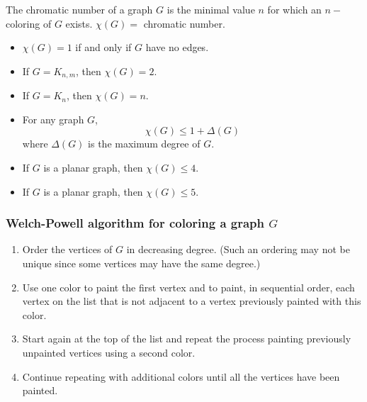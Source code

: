 \documentclass[aspectratio=169]{beamer}
\begin{document}
\begin{frame}
\begin{definition}
The chromatic number of a graph $G$ is the minimal value $n$ for which an $n-$coloring of $G$ exists.
$\chi (G)=$ chromatic number.
\end{definition}
\begin{theorem}
\begin{itemize}
\item $\chi (G)=1$ if and only if $G$ have no edges.
\item If $G=K_{n,m}$, then $\chi(G)=2$.
\item If $G=K_n$, then $\chi(G)=n$.
\item For any graph $G$, $$\chi (G)\leq 1+ \Delta (G)$$
where $\Delta (G)$ is the maximum degree of $G$.
\item If $G$ is a planar graph, then $\chi(G) \leq 4$.
\item If $G$ is a planar graph, then $\chi(G) \leq 5$.
\end{itemize}
\end{theorem}
\end{frame}


\begin{frame}\frametitle{Welch-Powell algorithm for coloring a graph $G$}
\begin{enumerate}
\item Order the vertices of $G$ in decreasing degree. (Such an ordering may not be unique
since some vertices may have the same degree.)
\item Use one color to paint the first vertex and to paint, in sequential order, each vertex
on the list that is not adjacent to a vertex previously painted with this color.
\item Start again at the top of the list and repeat the process painting previously unpainted
vertices using a second color.
\item Continue repeating with additional colors until all the vertices have been painted.
\end{enumerate}\end{frame}
\end{document}

